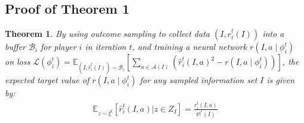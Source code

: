 \documentclass[letterpaper]{article} %
\makeatletter
\newtheorem{theorem}{Theorem}
\renewenvironment{align*}{%
  \linenomath 
  \start@align\@ne\st@rredtrue\m@ne
}{%
  \endalign
  \endlinenomath 
}
\makeatother
\begin{document}
\subsection{Proof of Theorem 1}
\begin{theorem}    
    By using outcome sampling to collect data $(I, \hat{r}_i^t(I))$ into a buffer $\mathcal{B}_i$ for player $i$ in iteration $t$, and training a neural network $r(I, a \mid \phi^t_i)$ on loss $\mathcal{L}(\phi_i^t)=\mathbb{E}_{(I, \hat{r}_i^t(I))\sim \mathcal{B}_i}\left[\sum_{a\in \mathcal{A}(I)}^{}\left(\hat{r}_i^t(I, a)^2 - r(I, a \mid \phi_i^t)\right)\right] $, the expected target value of $r(I, a \mid \phi_i^t)$ for any sampled information set $I$ is given by:
\begin{align*}
    \mathbb{E}_{z \sim \xi^t}\left[ \hat{r}_i^{t}(I, a) \vert z \in Z_I\right] =  \frac{r_i^t(I, a)}{\pi^{\xi^t}(I)}
\end{align*}
\end{theorem}
\end{document}
